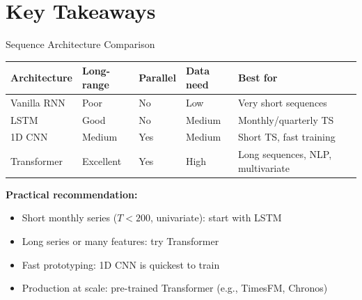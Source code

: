 \documentclass[aspectratio=169, 11pt]{beamer}
\begin{document}
\section{Key Takeaways}


\begin{frame}{Sequence Architecture Comparison}
  \begin{center}
    {\small
    \begin{tabular}{lllll}
      \toprule
      \textbf{Architecture} & \textbf{Long-range} & \textbf{Parallel} & \textbf{Data need} & \textbf{Best for} \\
      \midrule
      Vanilla RNN & Poor & No & Low & Very short sequences \\
      LSTM & Good & No & Medium & Monthly/quarterly TS \\
      1D CNN & Medium & Yes & Medium & Short TS, fast training \\
      Transformer & Excellent & Yes & High & Long sequences, NLP, multivariate \\
      \bottomrule
    \end{tabular}
    }
  \end{center}
  \begin{keybox}
    \textbf{Practical recommendation:}
    \begin{itemize}\small
      \item Short monthly series ($T < 200$, univariate): start with LSTM
      \item Long series or many features: try Transformer
      \item Fast prototyping: 1D CNN is quickest to train
      \item Production at scale: pre-trained Transformer (e.g., TimesFM, Chronos)
    \end{itemize}
  \end{keybox}
\end{frame}
\end{document}
